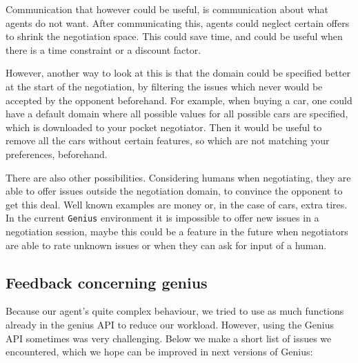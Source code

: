 Communication that however could be useful, is communication about what agents do not want. After communicating this, agents could neglect certain offers to shrink the negotiation space. This could save time, and could be useful when there is a time constraint or a discount factor. 

However, another way to look at this is that the domain could be specified better at the start of the negotiation, by filtering the issues which never would be accepted by the opponent beforehand. For example, when buying a car, one could have a default domain where all possible values for all possible cars are specified, which is 
downloaded to your pocket negotiator. Then it would be useful to remove all the cars without certain features, so which are not matching your preferences, beforehand. 

There are also other possibilities. Considering humans when negotiating, they are able to offer issues outside the negotiation domain, to convince the opponent to get this deal. Well known examples are money or, in the case of cars, extra tires. In the current \texttt{Genius} environment it is impossible to offer new issues in a negotiation session, maybe this could be a feature in the future when negotiators are able to rate unknown issues or when they can ask for input of a human. 

\subsection{Feedback concerning genius}

Because our agent's quite complex behaviour, we tried to use as much functions
already in the genius API to reduce our workload. However, using the Genius API 
sometimes was very challenging. Below we make a short list of issues we encountered,
which we hope can be improved in next versions of Genius:

